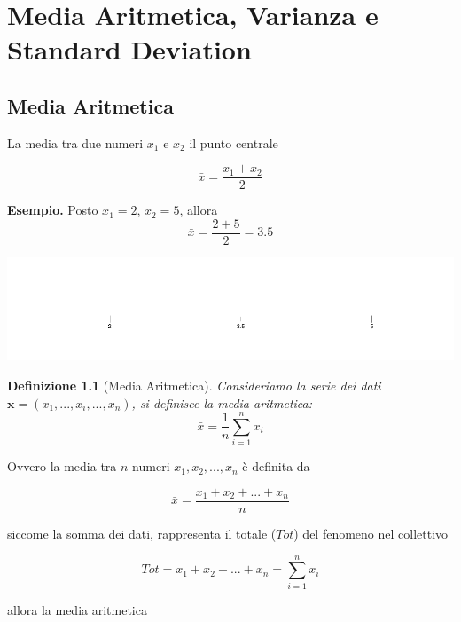 \documentclass[
  11pt,
]{book}
\theoremstyle{mytheoremstyle}
\theoremstyle{mydefstyle}
\newtheorem{definition}{Definizione}[section]
\begin{document}
\normalsize

\chapter{Media Aritmetica, Varianza e Standard Deviation}\label{media-aritmetica-varianza-e-standard-deviation}

\section{Media Aritmetica}\label{media}

La media tra due numeri \(x_1\) e \(x_2\) il punto centrale

\[\bar x = \frac{x_1+x_2}{2}\]

\textbf{Esempio.} Posto \(x_1=2\), \(x_2=5\), allora
\[\bar x =\frac{2+5}{2}=3.5\]

\begin{center}

\begin{center}\includegraphics{Appunti_di_Statistica_2025_files/figure-latex/03-media-varianza-2-1} \end{center}

\end{center}

\begin{info}

\begin{definition}[Media Aritmetica]
Consideriamo la serie dei dati \(\mathbf{x}=(x_1,...,x_i,...,x_n)\), si definisce la media aritmetica:
\[
\bar x =\frac 1 n \sum_{i=1}^nx_i 
\]
\end{definition}

\end{info}

Ovvero la media tra \(n\) numeri \(x_1, x_2,...,x_n\) è definita da

\[\bar x = \frac{x_1+x_2+...+x_n}{n}\]

siccome la somma dei dati, rappresenta il totale (\(Tot\)) del fenomeno nel collettivo

\[Tot=x_1+x_2+...+x_n=\sum_{i=1}^nx_i \]

allora la media aritmetica
\end{document}

